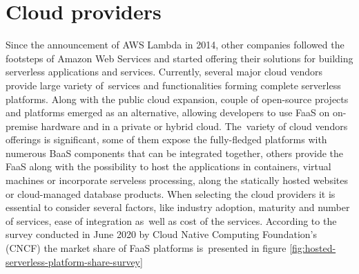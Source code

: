 \section{Cloud providers} \label{chapter:serverless-service-providers}

Since the announcement of AWS Lambda in 2014, other companies followed the footsteps of Amazon Web Services and started offering their solutions for building serverless applications and services. Currently, several major cloud vendors provide large variety of~services and functionalities forming complete serverless platforms. Along with the public cloud expansion, couple of open-source projects and platforms emerged as an alternative, allowing developers to use FaaS on on-premise hardware and in a private or hybrid cloud. The~variety of cloud vendors offerings is significant, some of them expose the fully-fledged platforms with numerous BaaS components that can be integrated together, others provide the FaaS along with the possibility to host the applications in containers, virtual machines or incorporate serveless processing, along the statically hosted websites or cloud-managed database products. When selecting the cloud providers it is essential to consider several factors, like industry adoption, maturity and number of services, ease of integration as~well as cost of the services. According to the survey conducted in June 2020 by Cloud Native Computing Foundation's (CNCF) \cite{CNCFServerlessSurvey2020} the market share of FaaS platforms is~presented in figure \ref{fig:hosted-serverless-platform-share-survey}

